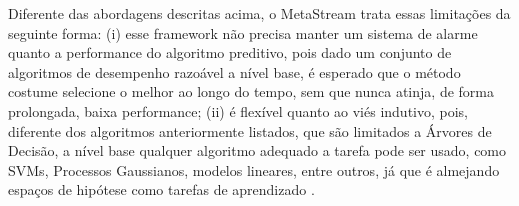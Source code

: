 Diferente das abordagens descritas acima, o MetaStream trata essas limitações da seguinte forma: (i) esse framework não precisa manter um sistema de alarme quanto a performance do algoritmo preditivo, pois dado um conjunto de algoritmos de desempenho razoável a nível base, é esperado que o método costume selecione o melhor ao longo do tempo, sem que nunca atinja, de forma prolongada, baixa performance; (ii) é flexível quanto ao viés indutivo, pois, diferente dos algoritmos anteriormente listados, que são limitados a Árvores de Decisão, a nível base qualquer algoritmo adequado a tarefa pode ser usado, como SVMs, Processos Gaussianos, modelos lineares, entre outros, já que é almejando espaços de hipótese como tarefas de aprendizado \cite{rossi2014metastream}.

